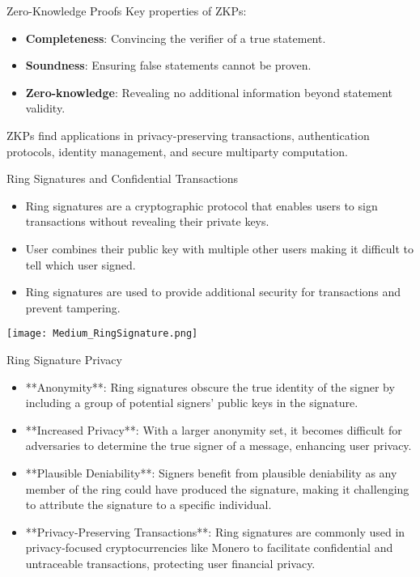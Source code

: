 \begin{withoutheadline}
\begin{frame}{Zero-Knowledge Proofs}
    Key properties of ZKPs:
    
    \begin{itemize}
        \item \textbf{Completeness}: Convincing the verifier of a true statement.
        \item \textbf{Soundness}: Ensuring false statements cannot be proven.
        \item \textbf{Zero-knowledge}: Revealing no additional information beyond statement validity.
    \end{itemize}
    
    ZKPs find applications in privacy-preserving transactions, authentication protocols, identity management, and secure multiparty computation.
\end{frame}

\begin{frame}{Ring Signatures and Confidential Transactions}
    \begin{itemize}
        \item Ring signatures are a cryptographic protocol that enables users to sign transactions without revealing their private keys.
        \item User combines their public key with multiple other users making it difficult to tell which user signed.
        \item Ring signatures are used to provide additional security for transactions and prevent tampering.
    \end{itemize}
    \texttt{[image: Medium\_RingSignature.png]}
\end{frame}

\begin{frame}{Ring Signature Privacy}
    \begin{itemize}
        \item **Anonymity**: Ring signatures obscure the true identity of the signer by including a group of potential signers' public keys in the signature.
        \item **Increased Privacy**: With a larger anonymity set, it becomes difficult for adversaries to determine the true signer of a message, enhancing user privacy.
        \item **Plausible Deniability**: Signers benefit from plausible deniability as any member of the ring could have produced the signature, making it challenging to attribute the signature to a specific individual.
        \item **Privacy-Preserving Transactions**: Ring signatures are commonly used in privacy-focused cryptocurrencies like Monero to facilitate confidential and untraceable transactions, protecting user financial privacy.
    \end{itemize}
\end{frame}


\end{withoutheadline}
